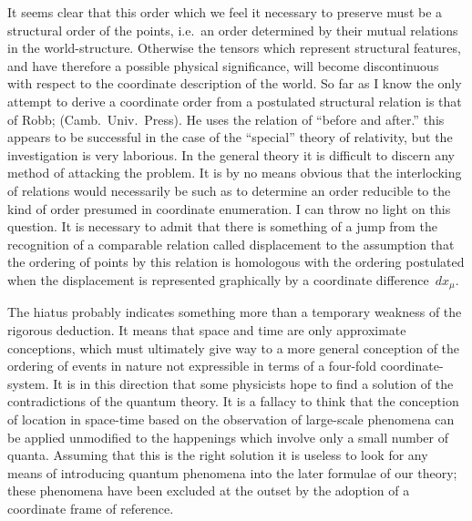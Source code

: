\documentclass[12pt]{book}
\begin{document}
It seems clear that this order which we feel it necessary to preserve must
be a structural order of the points, i.e.\ an order determined by their mutual
relations in the world-structure. Otherwise the tensors which represent
structural features, and have therefore a possible physical significance, will
become discontinuous with respect to the coordinate description of the world.
So far as I know the only attempt to derive a coordinate order from a postulated
structural relation is that of Robb\footnotemark;\footnotetext
  { (Camb.\ Univ.\ Press). He uses the relation of
  ``before and after.''}
this appears to be successful in the
case of the ``special'' theory of relativity, but the investigation is very
laborious. In the general theory it is difficult to discern any method of
attacking the problem. It is by no means obvious that the interlocking of
relations would necessarily be such as to determine an order reducible to the
kind of order presumed in coordinate enumeration. I can throw no light on
this question. It is necessary to admit that there is something of a jump
from the recognition of a comparable relation called displacement to the
assumption that the ordering of points by this relation is homologous with
the ordering postulated when the displacement is represented graphically by
a coordinate difference~$dx_{\mu}$.

The hiatus probably indicates something more than a temporary weakness
of the rigorous deduction. It means that space and time are only approximate
conceptions, which must ultimately give way to a more general conception of
the ordering of events in nature not expressible in terms of a four-fold coordinate-system.
It is in this direction that some physicists hope to find a solution
of the contradictions of the quantum theory. It is a fallacy to think that the
%
conception of location in space-time based on the observation of large-scale
phenomena can be applied unmodified to the happenings which involve only
a small number of quanta. Assuming that this is the right solution it is useless
to look for any means of introducing quantum phenomena into the later
formulae of our theory; these phenomena have been excluded at the outset
by the adoption of a coordinate frame of reference.
\end{document}
